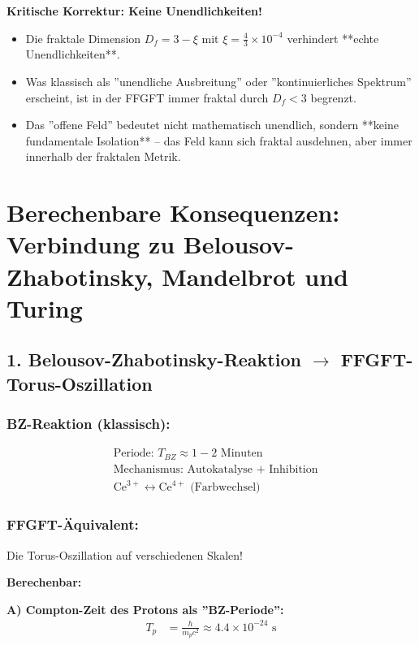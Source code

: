 \textbf{Kritische Korrektur: Keine Unendlichkeiten!}
\begin{itemize}[label=$\bullet$]
	\item Die fraktale Dimension $D_f = 3 - \xi$ mit $\xi = \frac{4}{3} \times 10^{-4}$ verhindert **echte Unendlichkeiten**.
	\item Was klassisch als ''unendliche Ausbreitung'' oder ''kontinuierliches Spektrum'' erscheint, ist in der FFGFT immer fraktal durch $D_f < 3$ begrenzt.
	\item Das ''offene Feld'' bedeutet nicht mathematisch unendlich, sondern **keine fundamentale Isolation** – das Feld kann sich fraktal ausdehnen, aber immer innerhalb der fraktalen Metrik.
\end{itemize}

\section*{Berechenbare Konsequenzen: Verbindung zu Belousov-Zhabotinsky, Mandelbrot und Turing}

\subsection*{1. Belousov-Zhabotinsky-Reaktion $\rightarrow$ FFGFT-Torus-Oszillation}

\subsubsection*{BZ-Reaktion (klassisch):}
\begin{align*}
	&\text{Periode: } T_{BZ} \approx 1-2 \text{ Minuten} \\
	&\text{Mechanismus: Autokatalyse + Inhibition} \\
	&\text{Ce}^{3+} \longleftrightarrow \text{Ce}^{4+} \text{ (Farbwechsel)}
\end{align*}

\subsubsection*{FFGFT-Äquivalent:}
Die Torus-Oszillation auf verschiedenen Skalen!

\textbf{Berechenbar:}

\textbf{A) Compton-Zeit des Protons als ''BZ-Periode'':}
\begin{align*}
	T_p &= \frac{h}{m_p c^2} \approx 4.4 \times 10^{-24} \text{ s}
\end{align*}

